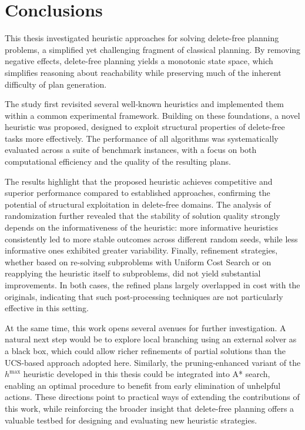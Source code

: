 \chapter{Conclusions}
This thesis investigated heuristic approaches for solving delete-free planning problems, a simplified yet challenging fragment of classical planning.
By removing negative effects, delete-free planning yields a monotonic state space, which simplifies reasoning about reachability while preserving
much of the inherent difficulty of plan generation.

The study first revisited several well-known heuristics and implemented them within a common experimental framework. Building on these foundations,
a novel heuristic was proposed, designed to exploit structural properties of delete-free tasks more effectively. The performance of all algorithms
was systematically evaluated across a suite of benchmark instances, with a focus on both computational efficiency and the quality of the resulting plans.

The results highlight that the proposed heuristic achieves competitive and superior performance compared to established approaches,
confirming the potential of structural exploitation in delete-free domains. The analysis of randomization further revealed that the stability of solution
quality strongly depends on the informativeness of the heuristic: more informative heuristics consistently led to more stable outcomes across different
random seeds, while less informative ones exhibited greater variability. Finally, refinement strategies, whether based on re-solving subproblems with
Uniform Cost Search or on reapplying the heuristic itself to subproblems, did not yield substantial improvements. In both cases,
the refined plans largely overlapped in cost with the originals, indicating that such post-processing techniques are not particularly effective in this setting.

At the same time, this work opens several avenues for further investigation. A natural next step would be to explore local branching using an external
solver as a black box, which could allow richer refinements of partial solutions than the \textsc{UCS}-based approach adopted here.
Similarly, the pruning-enhanced variant of the $h^{\max}$ heuristic developed in this thesis could be integrated into \textsc{A*} search, enabling an optimal procedure
to benefit from early elimination of unhelpful actions. These directions point to practical ways of extending the contributions of this work,
while reinforcing the broader insight that delete-free planning offers a valuable testbed for designing and evaluating new heuristic strategies.
